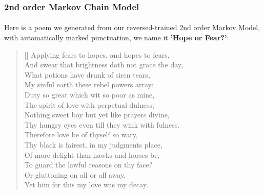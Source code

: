 \subsubsection{2nd order Markov Chain Model}
\paragraph{}
Here is a poem we generated from our reversed-trained 2nd order Markov Model, with automatically marked punctuation, we name it \textbf{'Hope or Fear?'}:
\renewcommand{\poemtoc}{subsection}
\settowidth{\versewidth}{Thy proud hearts slave and vassal wretch to be?}
\begin{verse}[\versewidth]
Applying fears to hopes, and hopes to fears,\\
And swear that brightness doth not grace the day,\\
What potions have drunk of siren tears,\\
My sinful earth these rebel powers array:\\
\vspace{5pt}
Duty so great which wit so poor as mine,\\
The spirit of love with perpetual dulness;\\
Nothing sweet boy but yet like prayers divine,\\
Thy hungry eyes even till they wink with fulness.\\
\vspace{5pt}
Therefore love be of thyself so wary,\\
Thy black is fairest, in my judgments place,\\
Of more delight than hawks and horses be,\\
To guard the lawful reasons on thy face?\\
\vspace{5pt}
\vin  Or gluttoning on all or all away,\\
\vin  Yet him for this my love was my decay.\\
\end{verse}

